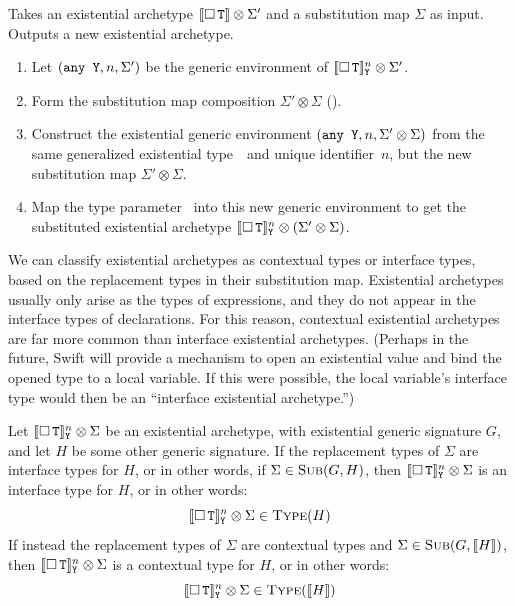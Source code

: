 \documentclass[../generics]{subfiles}
\begin{document}
\begin{algorithm}\label{alg:substitute existential archetype}
Takes an existential archetype $[\![\Box\,\texttt{T}]\!] \otimes \Sigma'$ and a substitution map $\Sigma$ as input. Outputs a new existential archetype.
\begin{enumerate}
\item Let $(\texttt{any~Y},n,\Sigma')$ be the generic environment of $[\![\Box\,\texttt{T}]\!]^n_{\texttt{Y}} \otimes \Sigma'$.
\item Form the substitution map composition $\Sigma' \otimes \Sigma$  ().
\item Construct the existential generic environment $(\texttt{any~Y}, n, \Sigma' \otimes \Sigma)$ from the same generalized existential type~\AnyY\ and unique identifier~$n$, but the new substitution map $\Sigma' \otimes \Sigma$.
\item Map the type parameter \tT\ into this new generic environment to get the substituted existential archetype $[\![\Box\,\texttt{T}]\!]^n_{\texttt{Y}} \otimes (\Sigma' \otimes \Sigma)$.
\end{enumerate}
\end{algorithm}

We can classify existential archetypes as contextual types or interface types, based on the replacement types in their substitution map. Existential archetypes usually only arise as the types of expressions, and they do not appear in the interface types of declarations. For this reason, contextual existential archetypes are far more common than interface existential archetypes. (Perhaps in the future, Swift will provide a mechanism to open an existential value and bind the opened type to a local variable. If this were possible, the local variable's interface type would then be an ``interface existential archetype.'')

\begin{definition}
Let $[\![\Box\,\texttt{T}]\!]^n_{\texttt{Y}} \otimes \Sigma$ be an existential archetype, with existential generic signature $G$, and let $H$ be some other generic signature. If the replacement types of $\Sigma$ are interface types for $H$, or in other words, if $\Sigma \in \textsc{Sub}({G, H})$, then $[\![\Box\,\texttt{T}]\!]^n_{\texttt{Y}} \otimes \Sigma$ is an interface type for $H$, or in other words:
\[
[\![\Box\,\texttt{T}]\!]^n_{\texttt{Y}} \otimes \Sigma \in \textsc{Type}({H})
\]
If instead the replacement types of $\Sigma$ are contextual types and $\Sigma \in \textsc{Sub}({G, [\![H]\!]})$, then $[\![\Box\,\texttt{T}]\!]^n_{\texttt{Y}} \otimes \Sigma$ is a contextual type for $H$, or in other words:
\[
[\![\Box\,\texttt{T}]\!]^n_{\texttt{Y}} \otimes \Sigma \in \textsc{Type}({[\![H]\!]})
\]
\end{definition}
\end{document}
